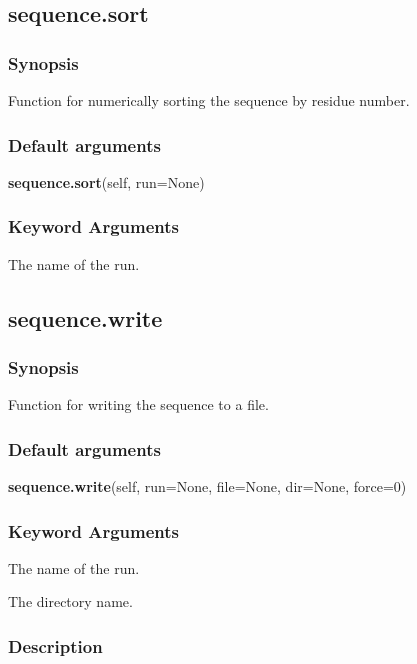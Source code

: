 \subsection{sequence.sort}


\subsubsection{Synopsis}

Function for numerically sorting the sequence by residue number.

\subsubsection{Default arguments}

\textsf{\textbf{sequence.sort}(self, run=None)}


\subsubsection{Keyword Arguments}

  The name of the run.


\newpage

\subsection{sequence.write}


\subsubsection{Synopsis}

Function for writing the sequence to a file.

\subsubsection{Default arguments}

\textsf{\textbf{sequence.write}(self, run=None, file=None, dir=None, force=0)}


\subsubsection{Keyword Arguments}

  The name of the run.

  The directory name.


\subsubsection{Description}

